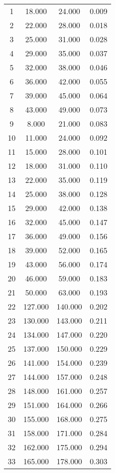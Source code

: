 % 
\begin{tabular}{cccc}
  \hline
  \hline
1 & 18.000 & 24.000 & 0.009 \\ 
  2 & 22.000 & 28.000 & 0.018 \\ 
  3 & 25.000 & 31.000 & 0.028 \\ 
  4 & 29.000 & 35.000 & 0.037 \\ 
  5 & 32.000 & 38.000 & 0.046 \\ 
  6 & 36.000 & 42.000 & 0.055 \\ 
  7 & 39.000 & 45.000 & 0.064 \\ 
  8 & 43.000 & 49.000 & 0.073 \\ 
  9 & 8.000 & 21.000 & 0.083 \\ 
  10 & 11.000 & 24.000 & 0.092 \\ 
  11 & 15.000 & 28.000 & 0.101 \\ 
  12 & 18.000 & 31.000 & 0.110 \\ 
  13 & 22.000 & 35.000 & 0.119 \\ 
  14 & 25.000 & 38.000 & 0.128 \\ 
  15 & 29.000 & 42.000 & 0.138 \\ 
  16 & 32.000 & 45.000 & 0.147 \\ 
  17 & 36.000 & 49.000 & 0.156 \\ 
  18 & 39.000 & 52.000 & 0.165 \\ 
  19 & 43.000 & 56.000 & 0.174 \\ 
  20 & 46.000 & 59.000 & 0.183 \\ 
  21 & 50.000 & 63.000 & 0.193 \\ 
  22 & 127.000 & 140.000 & 0.202 \\ 
  23 & 130.000 & 143.000 & 0.211 \\ 
  24 & 134.000 & 147.000 & 0.220 \\ 
  25 & 137.000 & 150.000 & 0.229 \\ 
  26 & 141.000 & 154.000 & 0.239 \\ 
  27 & 144.000 & 157.000 & 0.248 \\ 
  28 & 148.000 & 161.000 & 0.257 \\ 
  29 & 151.000 & 164.000 & 0.266 \\ 
  30 & 155.000 & 168.000 & 0.275 \\ 
  31 & 158.000 & 171.000 & 0.284 \\ 
  32 & 162.000 & 175.000 & 0.294 \\ 
  33 & 165.000 & 178.000 & 0.303 \\ 

\end{tabular}

